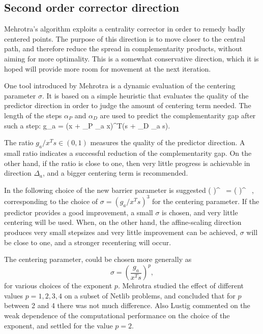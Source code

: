 
%
%
\subsection{Second order corrector direction}

Mehrotra's algorithm exploits a centrality corrector in order to 
remedy badly centered points. The purpose of this direction is 
to move closer to the central path, and therefore reduce the spread 
in complementarity products, without aiming for more optimality. 
This is a somewhat conservative direction, which it is hoped will 
provide more room for movement at the next iteration.

One tool introduced by Mehrotra \cite{Mehrotra92} is a dynamic evaluation 
of the centering parameter $\sigma$. It is based on a simple  
heuristic that evaluates the quality of the predictor direction
in order to judge the amount of centering term needed.
%
The length of the steps $\alpha_P$ and $\alpha_D$ are used to 
predict the complementarity gap after such a step:
\be \label{eq:PredictedGap}
  g_a = (x + \alpha_P \Delta_a x)^T(s + \alpha_D \Delta_a s).
\ee

The ratio $g_a / x^{T}s \in (0,1)$ measures the quality of the 
predictor direction.
A small ratio indicates a successful reduction of the complementarity 
gap. On the other hand, if the ratio is close to one, then very little 
progress is achievable in direction $\Delta_a$, and a bigger centering term
is recommended.

In \cite{Mehrotra92} the following choice of the new barrier parameter 
is suggested
%
\be \label{eq:Mu}
  \left(  \right)^{} \, 
           = \left(  \right)^{} \, ,
\ee
%
corresponding to the choice of $\sigma = (g_a / x^Ts)^3$ 
for the centering parameter. 
If the predictor provides a good improvement, a small $\sigma$ 
is chosen, and very little centering will be used. When, 
on the other hand, the affine-scaling direction produces very small stepsizes 
and very little improvement can be achieved, $\sigma$ will be 
close to one, and a stronger recentering will occur.

The centering parameter, could be chosen more generally as
\[
  \sigma = \left( \frac{g_a}{x^Ts} \right)^p\!\!,
\]
for various choices of the exponent $p$. Mehrotra \cite{Mehrotra92}
studied the effect of different values $p=1,2,3,4$
on a subset of Netlib problems, and concluded that for $p$ between
2 and 4 there was not much difference.
Also Lustig \etal \cite{LustigMarstenShanno} commented on the
weak dependence of the computational performance on the choice 
of the exponent, and settled for the value $p=2$.

